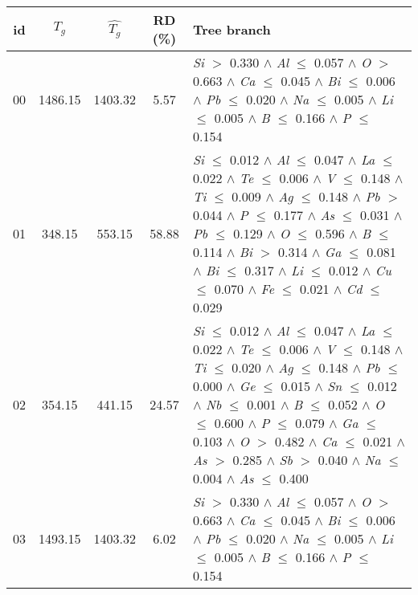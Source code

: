 \begin{table}[!htbp]
	\setlength{\tabcolsep}{3pt}
	\begin{tabular}{ccccm{}}
		\toprule
		id & $T_g$ & $\hat{T_g}$ & RD (\%) & Tree branch\\
		\midrule
		00 & 1486.15 & 1403.32 & 5.57 & \textit{Si} $>$ 0.330 $\wedge$ \textit{Al} $\le$ 0.057 $\wedge$ \textit{O} $>$ 0.663 $\wedge$ \textit{Ca} $\le$ 0.045 $\wedge$ \textit{Bi} $\le$ 0.006 $\wedge$ \textit{Pb} $\le$ 0.020 $\wedge$ \textit{Na} $\le$ 0.005 $\wedge$ \textit{Li} $\le$ 0.005 $\wedge$ \textit{B} $\le$ 0.166 $\wedge$ \textit{P} $\le$ 0.154\\
		\hline
		01 & 348.15 & 553.15 & 58.88 & \textit{Si} $\le$ 0.012 $\wedge$ \textit{Al} $\le$ 0.047 $\wedge$ \textit{La} $\le$ 0.022 $\wedge$ \textit{Te} $\le$ 0.006 $\wedge$ \textit{V} $\le$ 0.148 $\wedge$ \textit{Ti} $\le$ 0.009 $\wedge$ \textit{Ag} $\le$ 0.148 $\wedge$ \textit{Pb} $>$ 0.044 $\wedge$ \textit{P} $\le$ 0.177 $\wedge$ \textit{As} $\le$ 0.031 $\wedge$ \textit{Pb} $\le$ 0.129 $\wedge$ \textit{O} $\le$ 0.596 $\wedge$ \textit{B} $\le$ 0.114 $\wedge$ \textit{Bi} $>$ 0.314 $\wedge$ \textit{Ga} $\le$ 0.081 $\wedge$ \textit{Bi} $\le$ 0.317 $\wedge$ \textit{Li} $\le$ 0.012 $\wedge$ \textit{Cu} $\le$ 0.070 $\wedge$ \textit{Fe} $\le$ 0.021 $\wedge$ \textit{Cd} $\le$ 0.029\\
		\hline
		02 & 354.15 & 441.15 & 24.57 & \textit{Si} $\le$ 0.012 $\wedge$ \textit{Al} $\le$ 0.047 $\wedge$ \textit{La} $\le$ 0.022 $\wedge$ \textit{Te} $\le$ 0.006 $\wedge$ \textit{V} $\le$ 0.148 $\wedge$ \textit{Ti} $\le$ 0.020 $\wedge$ \textit{Ag} $\le$ 0.148 $\wedge$ \textit{Pb} $\le$ 0.000 $\wedge$ \textit{Ge} $\le$ 0.015 $\wedge$ \textit{Sn} $\le$ 0.012 $\wedge$ \textit{Nb} $\le$ 0.001 $\wedge$ \textit{B} $\le$ 0.052 $\wedge$ \textit{O} $\le$ 0.600 $\wedge$ \textit{P} $\le$ 0.079 $\wedge$ \textit{Ga} $\le$ 0.103 $\wedge$ \textit{O} $>$ 0.482 $\wedge$ \textit{Ca} $\le$ 0.021 $\wedge$ \textit{As} $>$ 0.285 $\wedge$ \textit{Sb} $>$ 0.040 $\wedge$ \textit{Na} $\le$ 0.004 $\wedge$ \textit{As} $\le$ 0.400\\
		\hline
		03 & 1493.15 & 1403.32 & 6.02 & \textit{Si} $>$ 0.330 $\wedge$ \textit{Al} $\le$ 0.057 $\wedge$ \textit{O} $>$ 0.663 $\wedge$ \textit{Ca} $\le$ 0.045 $\wedge$ \textit{Bi} $\le$ 0.006 $\wedge$ \textit{Pb} $\le$ 0.020 $\wedge$ \textit{Na} $\le$ 0.005 $\wedge$ \textit{Li} $\le$ 0.005 $\wedge$ \textit{B} $\le$ 0.166 $\wedge$ \textit{P} $\le$ 0.154\\

\end{tabular}
\end{table}
